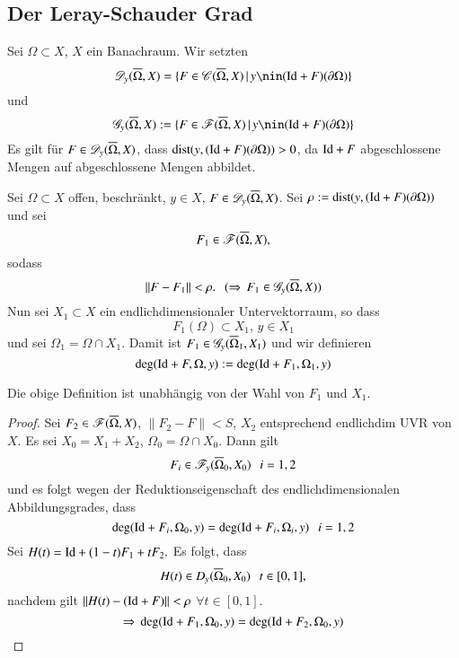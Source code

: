 \subsection{Der Leray-Schauder Grad}

Sei $\Omega\subset X$, $X$ ein Banachraum. Wir setzten
\[
    \ms D_y(\ol \Omega,X)=\{ F\in \ms C(\ol\Omega,X)\, | \, y\nin(\Id + F)(\partial \Omega) \}
\]
und
\[
    \ms G_y(\ol\Omega,X):=\{F\in \ms F(\ol \Omega,X)\, |\, y\nin(\Id+F)(\partial\Omega)\}
\]
Es gilt für $F\in \mathscr D_y(\overline \Omega,X)$, dass $\mathrm{dist}(y,(\mathrm{Id}+F)(\partial\Omega))>0$, da $\mathrm{Id}+F$
abgeschlossene Mengen auf abgeschlossene Mengen abbildet.

\begin{defi}{\label{3.8}}
    Sei $\Omega\subset X$ offen, beschränkt, $y\in X$, $F\in \mathscr D_y(\overline \Omega,X)$. Sei $\rho:=
    \mathrm{dist}(y,(\mathrm{Id}+F)(\partial \Omega))$ und sei
    \[
        F_1\in \mathscr F(\overline \Omega, X),
    \]
    sodass
    \[
        \|F-F_1\|<\rho. \hspace{.25cm} (\Rightarrow \, F_1\in \mathscr G_y(\overline \Omega,X))
    \]
    Nun sei $X_1\subset X$ ein endlichdimensionaler Untervektorraum, so dass
    \[
        F_1(\Omega)\subset X_1,\, y\in X_1
    \] 
    und sei $\Omega_1=\Omega\cap X_1$. Damit ist $F_1\in \mathscr G_y(\overline\Omega_1,X_1)$ und wir definieren
    \[
        \deg(\mathrm{Id}+F,\Omega,y):=\deg(\mathrm{Id}+F_1,\Omega_1,y)
    \]
\end{defi}

\begin{prop}\label{3.9}
    Die obige Definition ist unabhängig von der Wahl von $F_1$ und $X_1$.
\end{prop}

\begin{proof}
    Sei $F_2\in \mathscr F (\overline \Omega,X)$, $\|F_2-F\|<S$, $X_2$ entsprechend endlichdim UVR von $X$. Es sei
    $X_0=X_1+X_2$, $\Omega_0=\Omega\cap X_0$. Dann gilt
    \[
        F_i\in \mathscr F_y(\overline\Omega_0,X_0) \hspace{.25cm} i=1,2
    \]
    und es folgt wegen der Reduktionseigenschaft des endlichdimensionalen Abbildungsgrades, dass
    \[
        \deg(\mathrm{Id} + F_i,\Omega_0,y)=\deg(\mathrm{Id}+F_i,\Omega_i,y)\hspace{.25cm} i=1,2
    \]
    Sei $H(t)=\mathrm{Id} + (1-t)F_1+tF_2.$ Es folgt, dass
    \[
        H(t)\in D_y(\overline\Omega_0,X_0) \hspace{.25cm} t\in [0,1],
    \]
    nachdem gilt $\|H(t)-(\mathrm{Id}+F)\|<\rho$ $\forall t\in [0,1]$.
    \[
        \Rightarrow \, \deg(\mathrm{Id}+F_1,\Omega_0,y)=\deg(\mathrm{Id}+F_2,\Omega_0,y)
    \]
\end{proof}


